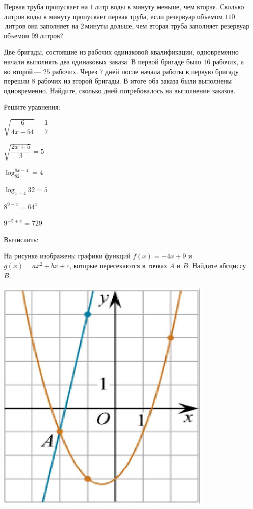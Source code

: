 \begin{listofex}
	\item Первая труба пропускает на \(1\) литр воды в минуту меньше, чем вторая. Сколько литров воды в минуту пропускает первая труба, если резервуар объемом \(110\) литров она заполняет на \(2\) минуты дольше, чем вторая труба заполняет резервуар объемом \(99\) литров?
	\item Две бригады, состоящие из рабочих одинаковой квалификации, одновременно начали выполнять два одинаковых заказа. В первой бригаде было \(16\) рабочих, а во второй — \(25\) рабочих. Через \(7\) дней после начала работы в первую бригаду перешли \(8\) рабочих из второй бригады. В итоге оба заказа были выполнены одновременно. Найдите, сколько дней потребовалось на выполнение заказов.
	\newpage
	\item Решите уравнения:
	\begin{enumcols}[itemcolumns=2]
		\item \( \sqrt{\dfrac{6}{4x-54}}=\dfrac{1}{7} \)
		\item \( \sqrt{\dfrac{2x+5}{3}}=5 \)
		\item \( \log_82^{8x-4}=4 \)
		\item \( \log_{x-4}32=5 \)
		\item \( 8^{9-x}=64^x\)
		\item \( 9^{-5+x}=729 \)
	\end{enumcols}
	\item Вычислить:
	\begin{enumcols}[itemcolumns=1]
		\item {}
		\item {}
	\end{enumcols}
	\item \begin{minipage}[t]{0.66\textwidth}
		На рисунке изображены графики функций \( f(x)=-4x+9 \) и \( g(x)=ax^2+bx+c \), которые пересекаются в точках \(A\) и \(B\). Найдите абсциссу  \( B \).
	\end{minipage}
	\begin{minipage}[c]{0.3\textwidth}
		\includegraphics[align=b, width=0.8\textwidth]{../pics/G111M3H2-1}
	\end{minipage}
\end{listofex}
